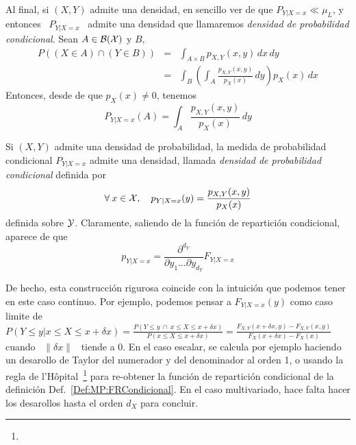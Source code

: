 {Al final, si $(X,Y)$ admite una  densidad, en sencillo ver de que $P_{Y|X=x} \ll
\mu_L$,  y entonces  \ $P_{Y|X=x}$  \ admite  una densidad  que  llamaremos {\it
  densidad de probabilidad condicional}. Sean $A \in \mathcal{B}(\mathcal{X})$ y $B$,
%
\begin{eqnarray*}
P\left( (X \in A) \cap (Y \in B) \right) & = & \int_{A \times B} p_{X,Y}(x,y) \, dx \, dy\\[2mm]
%
& = & \int_B \left( \int_A \frac{p_{X,Y}(x,y)}{p_X(x)} \, dy \right) p_X(x) \, dx
\end{eqnarray*}
%
Entonces, desde de que $p_X(x) \ne 0$, tenemos
%
\[
P_{Y|X=x}(A) = \int_A \frac{p_{X,Y}(x,y)}{p_X(x)} \, dy
\]
%
\begin{teorema}
  Si  $(X,Y)$ admite  una densidad  de probabilidad,  la medida  de probabilidad
  condicional  $P_{Y|X=x}$  admite  una   densidad,  llamada  {\it  densidad  de
    probabilidad condicional} definida por
  \[
  \forall \: x \in \mathcal{X}, \quad p_{Y|X=x}(y) = \frac{p_{X,Y}(x,y)}{p_X(x)}
  \]
  definida  sobre $\mathcal{Y}$. Claramente,  saliendo de  la funci\'on  de repartici\'on
  condicional, aparece de que
  \[
  p_{Y|X=x} = \frac{\partial^{d_Y}}{\partial y_1 \ldots \partial y_{d_Y}} F_{Y|X=x}
  \]
\end{teorema}

De hecho, esta  construcci\'on rigurosa coincide con la  intuici\'on que podemos
tener en este  caso continuo. Por ejemplo, podemos  pensar a $F_{Y|X=x}(y)$ como
caso limite de  $P(\left. Y \le y \right|  x \le X \le x+\delta x)  = \frac{P( Y
  \le  y \:  \cap \:  x \le  X \le  x+\delta x)}{P(x  \le X  \le x+\delta  x)} =
\frac{F_{X,Y}(x+\delta  x ,  y) -  F_{X,Y}(x  , y)}{F_X(x+\delta  x) -  F_X(x)}$
cuando \  $\| \delta  x\|$ \ tiende  a 0.   En el caso  escalar, se  calcula por
ejemplo haciendo un desarollo de Taylor del numerador y del denominador al orden
1, o  usando la  regla de l'H\^opital~\footnote{}  para re-obtener la
funci\'on     de     repartici\'on     condicional    de     la     definici\'on
Def.~\ref{Def:MP:FRCondicional}. En  el caso multivariado, hace  falta hacer los
desarollos hasta el orden $d_X$ para concluir.

}
